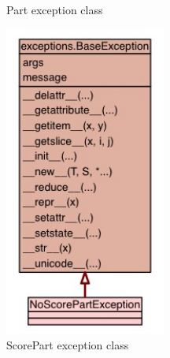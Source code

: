 \begin{appendices}
\begin{figure}[H]
\begin{minipage}{160pt}
\caption{Part exception class}	
\label{fig:parterror}
\end{minipage}
\begin{minipage}{160pt}
\includegraphics[width=150pt]{diagrams/jpegs/uml_class_diagram_for_implemen_21}	
\caption{ScorePart exception class}
\label{fig:scorepart}
\end{minipage}
\end{figure}

\end{appendices}

